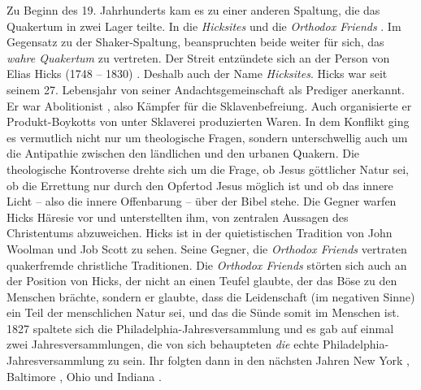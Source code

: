Zu Beginn des 19. Jahrhunderts kam es zu einer anderen Spaltung, die das
Quakertum in zwei Lager teilte. 
In die \textit{Hicksites}  und die
\textit{Orthodox
Friends} . Im Gegensatz zu der Shaker-Spaltung,
beanspruchten beide weiter für
sich, das \textit{wahre Quakertum} zu vertreten. Der Streit entzündete sich an
der Person von Elias Hicks (1748 -- 1830) .
Deshalb
auch der Name \textit{Hicksites}.
Hicks war seit seinem 27. Lebensjahr von seiner Andachtsgemeinschaft als
Prediger
anerkannt. Er war Abolitionist , also Kämpfer
für die Sklavenbefreiung. Auch
organisierte er Produkt-Boykotts von unter Sklaverei produzierten Waren. In dem
Konflikt ging es vermutlich nicht nur um theologische Fragen, sondern
unterschwellig auch um die Antipathie zwischen den ländlichen und den urbanen
Quakern. Die theologische Kontroverse drehte sich um die Frage, ob Jesus
göttlicher Natur sei, ob die Errettung nur durch den Opfertod Jesus möglich ist
und ob das innere Licht  -- also die innere Offenbarung --
über der Bibel  stehe.
Die Gegner warfen Hicks Häresie vor und unterstellten ihm, von zentralen
Aussagen des Christentums abzuweichen. Hicks ist in der quietistischen
 Tradition
von John Woolman  und Job Scott
 zu sehen. Seine Gegner, die \textit{Orthodox
Friends}  vertraten quakerfremde christliche 
Traditionen. Die
\textit{Orthodox Friends} störten sich auch an der Position von Hicks, der nicht
an einen Teufel  glaubte, der das Böse zu den Menschen
brächte, sondern er
glaubte, dass die Leidenschaft (im negativen Sinne) ein Teil der menschlichen
Natur sei, und das die Sünde  somit im Menschen ist. 1827 spaltete
sich die
Philadelphia-Jahresversammlung und es gab auf einmal zwei Jahresversammlungen,
die von sich behaupteten \textit{die} echte Philadelphia-Jahresversammlung zu
sein.
Ihr folgten dann in den nächsten Jahren New York , 
Baltimore , Ohio  und
Indiana .

\medskip

